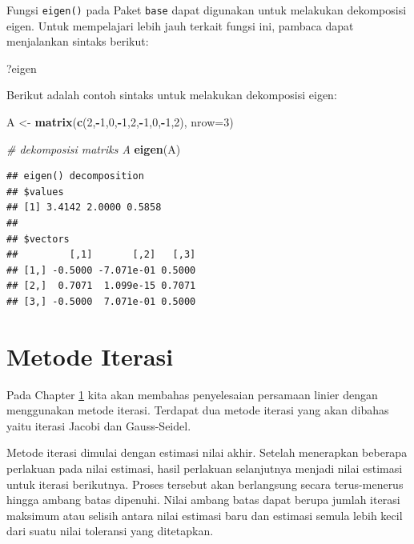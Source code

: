 \documentclass[]{book}
\newenvironment{Shaded}{\begin{snugshade}}{\end{snugshade}}
\newcommand{\CommentTok}[1]{\textcolor[rgb]{0.56,0.35,0.01}{\textit{#1}}}
\newcommand{\DataTypeTok}[1]{\textcolor[rgb]{0.13,0.29,0.53}{#1}}
\newcommand{\DecValTok}[1]{\textcolor[rgb]{0.00,0.00,0.81}{#1}}
\newcommand{\KeywordTok}[1]{\textcolor[rgb]{0.13,0.29,0.53}{\textbf{#1}}}
\newcommand{\NormalTok}[1]{#1}
\newcommand{\OperatorTok}[1]{\textcolor[rgb]{0.81,0.36,0.00}{\textbf{#1}}}
\newcommand{\StringTok}[1]{\textcolor[rgb]{0.31,0.60,0.02}{#1}}
\theoremstyle{definition}
\theoremstyle{definition}
\theoremstyle{definition}
\theoremstyle{remark}
\begin{document}
Fungsi \texttt{eigen()} pada Paket \texttt{base} dapat digunakan untuk melakukan dekomposisi eigen. Untuk mempelajari lebih jauh terkait fungsi ini, pambaca dapat menjalankan sintaks berikut:

\begin{Shaded}
\begin{Highlighting}[]
\NormalTok{?eigen}
\end{Highlighting}
\end{Shaded}

Berikut adalah contoh sintaks untuk melakukan dekomposisi eigen:

\begin{Shaded}
\begin{Highlighting}[]
\NormalTok{A <-}\StringTok{ }\KeywordTok{matrix}\NormalTok{(}\KeywordTok{c}\NormalTok{(}\DecValTok{2}\NormalTok{,}\OperatorTok{-}\DecValTok{1}\NormalTok{,}\DecValTok{0}\NormalTok{,}\OperatorTok{-}\DecValTok{1}\NormalTok{,}\DecValTok{2}\NormalTok{,}\OperatorTok{-}\DecValTok{1}\NormalTok{,}\DecValTok{0}\NormalTok{,}\OperatorTok{-}\DecValTok{1}\NormalTok{,}\DecValTok{2}\NormalTok{), }\DataTypeTok{nrow=}\DecValTok{3}\NormalTok{)}

\CommentTok{# dekomposisi matriks A}
\KeywordTok{eigen}\NormalTok{(A)}
\end{Highlighting}
\end{Shaded}

\begin{verbatim}
## eigen() decomposition
## $values
## [1] 3.4142 2.0000 0.5858
## 
## $vectors
##         [,1]       [,2]   [,3]
## [1,] -0.5000 -7.071e-01 0.5000
## [2,]  0.7071  1.099e-15 0.7071
## [3,] -0.5000  7.071e-01 0.5000
\end{verbatim}

\hypertarget{iteratif}{%
\section{Metode Iterasi}\label{iteratif}}

Pada Chapter \ref{iteratif} kita akan membahas penyelesaian persamaan linier dengan menggunakan metode iterasi. Terdapat dua metode iterasi yang akan dibahas yaitu iterasi Jacobi dan Gauss-Seidel.

Metode iterasi dimulai dengan estimasi nilai akhir. Setelah menerapkan beberapa perlakuan pada nilai estimasi, hasil perlakuan selanjutnya menjadi nilai estimasi untuk iterasi berikutnya. Proses tersebut akan berlangsung secara terus-menerus hingga ambang batas dipenuhi. Nilai ambang batas dapat berupa jumlah iterasi maksimum atau selisih antara nilai estimasi baru dan estimasi semula lebih kecil dari suatu nilai toleransi yang ditetapkan.
\end{document}
